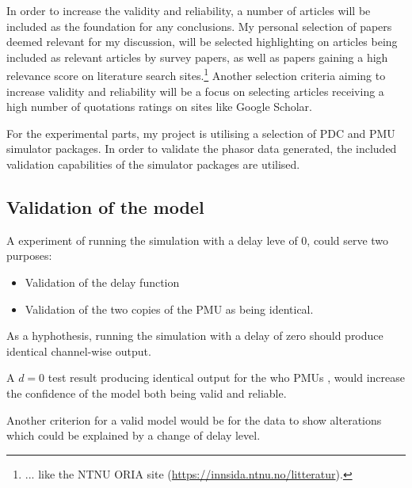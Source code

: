 In order to increase the validity and reliability, a number of articles will be included as the foundation for any conclusions. My personal selection of papers deemed relevant for my discussion, will be selected highlighting on articles being included as relevant articles by survey papers, as well as papers gaining a high relevance score on literature search sites.\footnote{... like the NTNU ORIA site (\url{https://innsida.ntnu.no/litteratur}).} Another selection criteria aiming to increase validity and reliability will be a focus on selecting articles receiving a high number of quotations ratings on sites like Google Scholar. %



For the experimental parts, my project is utilising a selection of PDC and PMU simulator packages. In order to validate the phasor data generated, the included validation capabilities of the simulator packages are utilised. 
\subsection{Validation of the model}
A experiment of running the simulation with a delay leve of 0, could serve two purposes:
\begin{itemize}
    \item Validation of the delay function
    \item Validation of the two copies of the PMU as being identical.
\end{itemize}
As a hyphothesis, running the simulation with a delay of zero should produce identical channel-wise output.

A $d=0$ test result  producing identical output for the who PMUs , would increase the 
confidence of the model both being valid and reliable.

Another criterion for a valid model would be for the data to show alterations which could be explained by a change of delay level.



